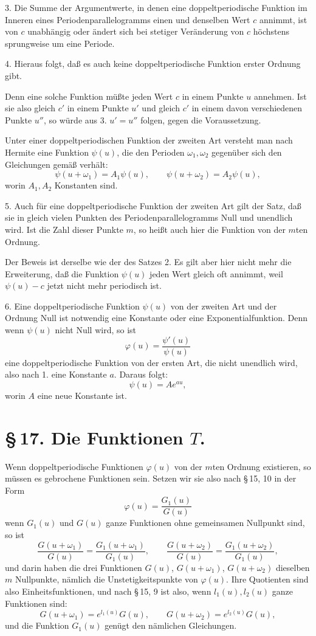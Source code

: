 \documentclass[11pt]{article}
\begin{document}
3. Die Summe der Argumentwerte, in denen eine doppeltperiodische Funktion im Inneren eines Periodenparallelogramms einen und denselben Wert $c$ annimmt, ist von $c$ unabhängig oder ändert sich bei stetiger Veränderung von $c$ höchstens sprungweise um eine Periode.

4. Hieraus folgt, daß es auch keine doppeltperiodische Funktion erster Ordnung gibt.

Denn eine solche Funktion müßte jeden Wert $c$ in einem Punkte $u$ annehmen. Ist sie also gleich $c'$ in einem Punkte $u'$ und gleich $c'$ in einem davon verschiedenen Punkte $u''$, so würde aus 3. $u'=u''$ folgen, gegen die Voraussetzung.

Unter einer doppeltperiodischen Funktion der zweiten Art versteht man nach Hermite eine Funktion $\psi(u)$, die den Perioden $\omega_1,\omega_2$ gegenüber sich den Gleichungen gemäß verhält:
\[
\psi(u+\omega_1)=A_1\psi(u),\qquad
\psi(u+\omega_2)=A_2\psi(u),
\]
worin $A_1,A_2$ Konstanten sind.

5. Auch für eine doppeltperiodische Funktion der zweiten Art gilt der Satz, daß sie in gleich vielen Punkten des Periodenparallelogramms Null und unendlich wird. Ist die Zahl dieser Punkte $m$, so heißt auch hier die Funktion von der $m$ten Ordnung.

Der Beweis ist derselbe wie der des Satzes 2. Es gilt aber hier nicht mehr die Erweiterung, daß die Funktion $\psi(u)$ jeden Wert gleich oft annimmt, weil $\psi(u)-c$ jetzt nicht mehr periodisch ist.

6. Eine doppeltperiodische Funktion $\psi(u)$ von der zweiten Art und der Ordnung Null ist notwendig eine Konstante oder eine Exponentialfunktion. Denn wenn $\psi(u)$ nicht Null wird, so ist
\[
\varphi(u)=\frac{\psi'(u)}{\psi(u)}
\]
eine doppeltperiodische Funktion von der ersten Art, die nicht unendlich wird, also nach 1. eine Konstante $a$. Daraus folgt:
\[
\psi(u)=Ae^{au},
\]
worin $A$ eine neue Konstante ist.

\section*{\S\,17. Die Funktionen $T$.}

Wenn doppeltperiodische Funktionen $\varphi(u)$ von der $m$ten Ordnung existieren, so müssen es gebrochene Funktionen sein. Setzen wir sie also nach \S\,15, 10 in der Form
\begin{equation}
\varphi(u)=\frac{G_1(u)}{G(u)}
\tag{1}
\end{equation}
wenn $G_1(u)$ und $G(u)$ ganze Funktionen ohne gemeinsamen Nullpunkt sind, so ist
\[
\frac{G(u+\omega_1)}{G(u)}=\frac{G_1(u+\omega_1)}{G_1(u)},\qquad
\frac{G(u+\omega_2)}{G(u)}=\frac{G_1(u+\omega_2)}{G_1(u)},
\]
und darin haben die drei Funktionen $G(u)$, $G(u+\omega_1)$, $G(u+\omega_2)$ dieselben $m$ Nullpunkte, nämlich die Unstetigkeitspunkte von $\varphi(u)$. Ihre Quotienten sind also Einheitsfunktionen, und nach \S\,15, 9 ist also, wenn $l_1(u),l_2(u)$ ganze Funktionen sind:
\begin{equation}
G(u+\omega_1)=e^{l_1(u)}G(u),\qquad
G(u+\omega_2)=e^{l_2(u)}G(u),
\tag{2}
\end{equation}
und die Funktion $G_1(u)$ genügt den nämlichen Gleichungen.
\end{document}
